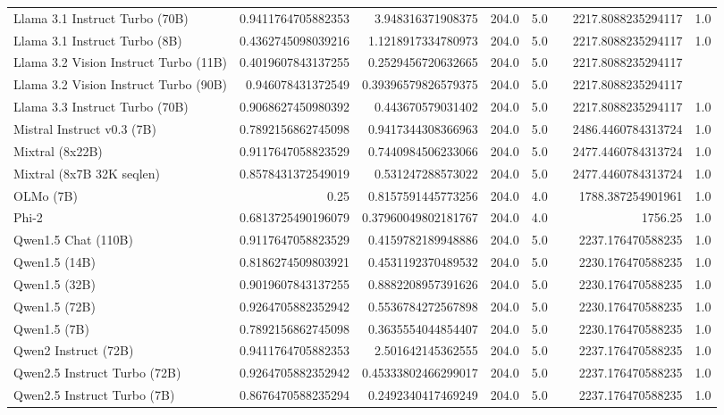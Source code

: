 \begin{table}[htp]
{\begin{tabular}{lrrrrrrr}
Llama 3.1 Instruct Turbo (70B) & 0.9411764705882353 & 3.948316371908375 & 204.0 & 5.0 &  & 2217.8088235294117 & 1.0 \\
Llama 3.1 Instruct Turbo (8B) & 0.4362745098039216 & 1.1218917334780973 & 204.0 & 5.0 &  & 2217.8088235294117 & 1.0 \\
Llama 3.2 Vision Instruct Turbo (11B) & 0.4019607843137255 & 0.2529456720632665 & 204.0 & 5.0 &  & 2217.8088235294117 &  \\
Llama 3.2 Vision Instruct Turbo (90B) & 0.946078431372549 & 0.39396579826579375 & 204.0 & 5.0 &  & 2217.8088235294117 &  \\
Llama 3.3 Instruct Turbo (70B) & 0.9068627450980392 & 0.443670579031402 & 204.0 & 5.0 &  & 2217.8088235294117 & 1.0 \\
Mistral Instruct v0.3 (7B) & 0.7892156862745098 & 0.9417344308366963 & 204.0 & 5.0 &  & 2486.4460784313724 & 1.0 \\
Mixtral (8x22B) & 0.9117647058823529 & 0.7440984506233066 & 204.0 & 5.0 &  & 2477.4460784313724 & 1.0 \\
Mixtral (8x7B 32K seqlen) & 0.8578431372549019 & 0.531247288573022 & 204.0 & 5.0 &  & 2477.4460784313724 & 1.0 \\
OLMo (7B) & 0.25 & 0.8157591445773256 & 204.0 & 4.0 &  & 1788.387254901961 & 1.0 \\
Phi-2 & 0.6813725490196079 & 0.37960049802181767 & 204.0 & 4.0 &  & 1756.25 & 1.0 \\
Qwen1.5 Chat (110B) & 0.9117647058823529 & 0.4159782189948886 & 204.0 & 5.0 &  & 2237.176470588235 & 1.0 \\
Qwen1.5 (14B) & 0.8186274509803921 & 0.4531192370489532 & 204.0 & 5.0 &  & 2230.176470588235 & 1.0 \\
Qwen1.5 (32B) & 0.9019607843137255 & 0.8882208957391626 & 204.0 & 5.0 &  & 2230.176470588235 & 1.0 \\
Qwen1.5 (72B) & 0.9264705882352942 & 0.5536784272567898 & 204.0 & 5.0 &  & 2230.176470588235 & 1.0 \\
Qwen1.5 (7B) & 0.7892156862745098 & 0.3635554044854407 & 204.0 & 5.0 &  & 2230.176470588235 & 1.0 \\
Qwen2 Instruct (72B) & 0.9411764705882353 & 2.501642145362555 & 204.0 & 5.0 &  & 2237.176470588235 & 1.0 \\
Qwen2.5 Instruct Turbo (72B) & 0.9264705882352942 & 0.45333802466299017 & 204.0 & 5.0 &  & 2237.176470588235 & 1.0 \\
Qwen2.5 Instruct Turbo (7B) & 0.8676470588235294 & 0.2492340417469249 & 204.0 & 5.0 &  & 2237.176470588235 & 1.0 \\

\end{tabular}}
\end{table}
